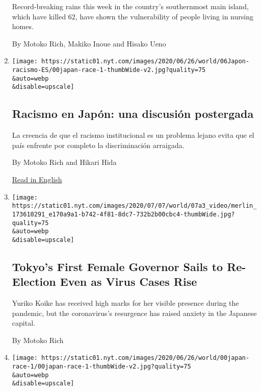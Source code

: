 \begin{enumerate}
  Record-breaking rains this week in the country's southernmost main
  island, which have killed 62, have shown the vulnerability of people
  living in nursing homes.

  By Motoko Rich, Makiko Inoue and Hisako Ueno
\item
  \href{/es/2020/07/06/espanol/mundo/racismo-japon-protestas.html}{}

  \texttt{[image: https://static01.nyt.com/images/2020/06/26/world/06Japon-racismo-ES/00japan-race-1-thumbWide-v2.jpg?quality=75\\\&auto=webp\\\&disable=upscale]}

  \hypertarget{racismo-en-japuxf3n-una-discusiuxf3n-postergada}{%
  \subsection{Racismo en Japón: una discusión
  postergada}\label{racismo-en-japuxf3n-una-discusiuxf3n-postergada}}

  La creencia de que el racismo institucional es un problema lejano
  evita que el país enfrente por completo la discriminación arraigada.

  By Motoko Rich and Hikari Hida

  \href{https://www.nytimes.com/2020/07/01/world/asia/japan-racism-black-lives-matter.html}{Read
  in English}
\item
  \href{/2020/07/05/world/asia/tokyo-governor-election.html}{}

  \texttt{[image: https://static01.nyt.com/images/2020/07/07/world/07a3\_video/merlin\_173610291\_e170a9a1-b742-4f81-8dc7-732b2b00cbc4-thumbWide.jpg?quality=75\\\&auto=webp\\\&disable=upscale]}

  \hypertarget{tokyos-first-female-governor-sails-to-re-election-even-as-virus-cases-rise}{%
  \subsection{Tokyo's First Female Governor Sails to Re-Election Even as
  Virus Cases
  Rise}\label{tokyos-first-female-governor-sails-to-re-election-even-as-virus-cases-rise}}

  Yuriko Koike has received high marks for her visible presence during
  the pandemic, but the coronavirus's resurgence has raised anxiety in
  the Japanese capital.

  By Motoko Rich
\item
  \href{/2020/07/01/world/asia/japan-racism-black-lives-matter.html}{}

  \texttt{[image: https://static01.nyt.com/images/2020/06/26/world/00japan-race-1/00japan-race-1-thumbWide-v2.jpg?quality=75\\\&auto=webp\\\&disable=upscale]}


\end{enumerate}
